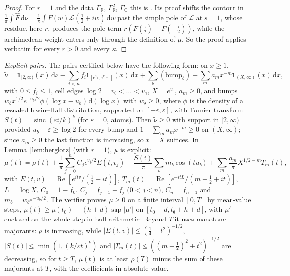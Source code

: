 \documentclass[11pt]{amsart}
\newcommand{\dd}{\,\mathrm d}
\newcommand{\eps}{\varepsilon}
\renewcommand{\Re}{\operatorname{Re}}
\newcommand{\one}{\mathbf 1}
\newcommand{\hF}{\widehat F}
\newcommand{\GR}{\Gamma_{\mathbb R}}
\newcommand{\GC}{\Gamma_{\mathbb C}}
\theoremstyle{definition}
\theoremstyle{remark}
\numberwithin{equation}{section}
\begin{document}
\begin{proof}
For $r=1$ and the data $\GR$, $\GR^2$, $\GC$ this is \cite[Lemma~5.8]{PaperI}. Its proof shifts the contour in
$\frac1\pi\int\hF\dd\nu=\frac1\pi\int F(w)\mathcal L(\frac12+iw)\dd w$ past the simple pole of $\mathcal L$ at $s=1$, whose residue, here $r$,
produces the pole term $r(F(\frac i2)+F(-\frac i2))$, while the archimedean weight enters only through the definition of $\mu$. So the proof
applies verbatim for every $r>0$ and every $\kappa$.
\end{proof}

\emph{Explicit pairs.} The pairs certified below have the following form: on $x\ge1$,
\[
\tilde\nu=\one_{[2,\infty)}(x)\dd x-\sum_{i<n}f_i\one_{[e^{v_i},e^{v_{i+1}}]}(x)\dd x+\sum_b(\text{bump}_b)-\sum_ma_mx^{-m}\one_{(X,\infty)}(x)\dd x,
\]
with $0\le f_i\le1$, cell edges $\log2=v_0<\dots<v_n$, $X=e^{v_n}$, $a_m\ge0$, and bumps
$w_bx^{1/2}e^{-u_b/2}\phi(\log x-u_b)\dd(\log x)$ with $w_b\ge0$, where $\phi$ is the density of a rescaled Irwin--Hall
distribution, supported on $[-\eps,\eps]$, with Fourier transform $S(t)=\operatorname{sinc}(\eps t/k)^k$ (for $\eps=0$, atoms). Then
$\tilde\nu\ge0$ with support in $[2,\infty)$ provided $u_b-\eps\ge\log2$ for every bump and $1-\sum_ma_mx^{-m}\ge0$ on $(X,\infty)$; since
$a_m\ge0$ the last function is increasing, so $x=X$ suffices. In Lemma~\ref{lem:herglotz} (with $r=1$), $\mu$ is explicit:
\[
\mu(t)=\rho(t)+\frac1\pi\sum_{j=0}^nC_je^{v_j/2}E(t,v_j)-\frac{S(t)}\pi\sum_bm_b\cos(tu_b)+\sum_m\frac{a_m}\pi X^{1/2-m}T_m(t),
\]
with $E(t,v)=\Re[e^{itv}/(\frac12+it)]$, $T_m(t)=\Re[e^{-itL}/(m-\frac12+it)]$, $L=\log X$, $C_0=1-f_0$, $C_j=f_{j-1}-f_j$
($0<j<n$), $C_n=f_{n-1}$ and $m_b=w_be^{-u_b/2}$. The verifier proves $\mu\ge0$ on a finite interval $[0,T]$ by mean-value steps,
$\mu(t)\ge\mu(t_0)-(h+d)\sup\lvert\mu'\rvert$ on $[t_0-d,t_0+h+d]$, with $\mu'$ enclosed on the whole step in ball arithmetic. Beyond
$T$ it uses monotone majorants: $\rho$ is increasing, while $\lvert E(t,v)\rvert\le(\frac14+t^2)^{-1/2}$,
$\lvert S(t)\rvert\le\min(1,(k/\eps t)^k)$ and $\lvert T_m(t)\rvert\le((m-\frac12)^2+t^2)^{-1/2}$ are decreasing, so for $t\ge T$, $\mu(t)$ is at
least $\rho(T)$ minus the sum of these majorants at $T$, with the coefficients in absolute value.
\end{document}
